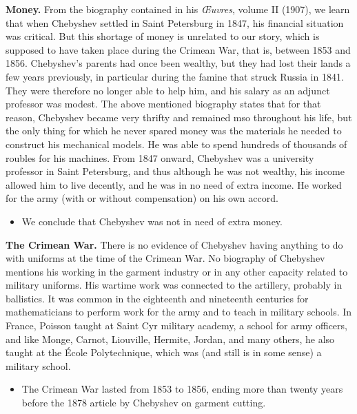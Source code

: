 \documentclass[12pt]{article}
\begin{document}
{\bf Money.} From the biography contained in his {\it \OE uvres}, volume II (1907), we learn that when Chebyshev settled in Saint Petersburg in 1847, his financial situation was critical. But this shortage of money is unrelated to our story, which is supposed to have taken place during the Crimean War, that is, between 1853 and 1856. Chebyshev's parents had once been wealthy, but they had lost their lands a few years previously, in particular during the famine that struck Russia in 1841. They were therefore no longer able to help him, and his salary as an adjunct professor was modest. The above mentioned biography states that for that reason, Chebyshev became very thrifty and remained mso throughout his life, but the only thing for which he never spared money was the materials he needed to construct his mechanical models. He was able to spend hundreds of thousands of roubles for his machines. From 1847 onward, Chebyshev was a university professor in Saint Petersburg, and thus although he was not wealthy, his income allowed him to live decently, and he was in no need of extra income. He worked for the army (with or without compensation) on his own accord.

\begin{itemize}

\item[$\bullet$]We conclude that Chebyshev was not in need of extra money.

\end{itemize}

{\bf The Crimean War.} There is no evidence of Chebyshev having anything to do with uniforms at the time of the Crimean War. No biography of Chebyshev mentions his working in the garment industry or in any other capacity related to military uniforms. His wartime work was connected to the artillery, probably in ballistics. It was common in the eighteenth and nineteenth centuries for mathematicians to perform work for the army and to teach in military schools. In France, Poisson taught at Saint Cyr military academy, a school for army officers, and like Monge, Carnot, Liouville, Hermite, Jordan, and many others, he also taught at the \'Ecole Polytechnique, which was (and still is in some sense) a military school.

\begin{itemize}

\item[$\bullet$]The Crimean War lasted from 1853 to 1856, ending more than twenty years before the 1878 article by Chebyshev on garment cutting.

\end{itemize}
\end{document}
